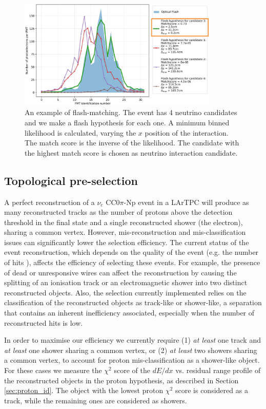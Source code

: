 \begin{figure}[htbp]
\centering
\includegraphics[width=0.85\textwidth]{figures/flashmatch.png} 
\caption{An example of flash-matching. The event has 4 neutrino candidates and we make a flash hypothesis for each one. A minimum binned likelihood is calculated, varying the $x$ position of the interaction. The match score is the inverse of the likelihood. The candidate with the highest match score is chosen as neutrino interaction candidate.} 
\label{fig:flashmatch}
\end{figure}

\subsection{Topological pre-selection} \label{sec:topological_pre_selection}
A perfect reconstruction of a $\nu_{e}$ CC0$\pi$-Np event in a LArTPC will produce as many reconstructed tracks as the number of protons above the detection threshold in the final state and a single reconstructed shower (the electron), sharing a common vertex. However, mis-reconstruction and mis-classification issues can significantly lower the selection efficiency. The current status of the event reconstruction, which depends on the quality of the event (e.g. the number of hits \cite{Acciarri:2017hat}), affects the efficiency of selecting these events. For example, the presence of dead or unresponsive wires can affect the reconstruction by causing the splitting of an ionisation track or an electromagnetic shower into two distinct reconstructed objects. Also, the selection currently implemented relies on the classification of the reconstructed objects as track-like or shower-like, a separation that contains an inherent inefficiency associated, especially when the number of reconstructed hits is low.

In order to maximise our efficiency we currently require (1) \emph{at least} one track and \emph{at least} one shower sharing a common vertex, or (2) \emph{at least} two showers sharing a common vertex, to account for proton mis-classification as a shower-like object. For these cases we measure the $\chi^2$ score of the $dE/dx$ vs. residual range profile of the reconstructed objects in the proton hypothesis, as described in Section \ref{sec:proton_id}. The object with the lowest proton $\chi^2$ score is considered as a track, while the remaining ones are considered as showers.

